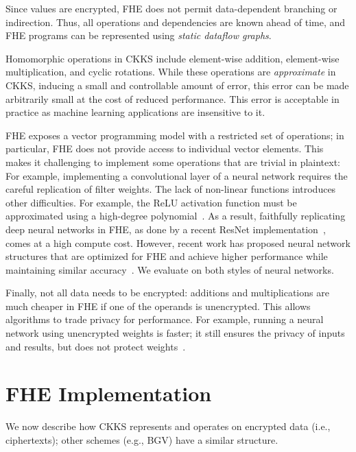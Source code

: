 Since values are encrypted, FHE does not permit data-dependent branching or
indirection. Thus, all operations and dependencies are known ahead of time, and
FHE programs can be represented using \emph{static dataflow graphs}.

Homomorphic operations in CKKS include element-wise addition, element-wise
multiplication, and cyclic rotations. While these operations are
\emph{approximate} in CKKS, inducing a small and controllable amount of error,
this error can be made arbitrarily small at the cost of reduced performance.
This error is acceptable in practice as machine learning applications are
insensitive to it.

FHE exposes a vector programming model with a restricted set of operations; in
particular, FHE does not provide access to individual vector elements. This
makes it challenging to implement some operations that are trivial in
plaintext: For example, implementing a convolutional layer of a neural network
requires the careful replication of filter weights. The lack of non-linear
functions introduces other difficulties. For example, the ReLU activation
function must be approximated using a high-degree
polynomial~\cite{lee:2021:precise}. As a result, faithfully replicating deep
neural networks in FHE, as done by a recent ResNet
implementation~\cite{lee:2021:privacy}, comes at a high compute cost. However,
recent work has proposed neural network structures that are optimized for FHE
and achieve higher performance while maintaining similar
accuracy~\cite{brutzkus:icml19:low}. We evaluate \name on both styles of neural
networks.

Finally, not all data needs to be encrypted: additions and multiplications are
much cheaper in FHE if one of the operands is unencrypted. This allows
algorithms to trade privacy for performance. For example, running a neural
network using unencrypted weights is faster; it still ensures the privacy of
inputs and results, but does not protect weights~\cite{brutzkus:icml19:low}.

\section{FHE Implementation}
\label{sec:fhe_operation}

We now describe how CKKS represents and operates on encrypted data (i.e.,
ciphertexts); other schemes (e.g., BGV) have a similar structure.

